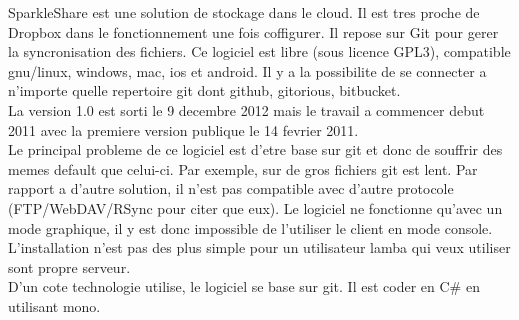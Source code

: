 SparkleShare est une solution de stockage dans le cloud. Il est tres proche de Dropbox dans le fonctionnement une fois coffigurer. Il repose sur Git pour gerer la syncronisation des fichiers. Ce logiciel est libre (sous licence GPL3), compatible gnu/linux, windows, mac, ios et android. Il y a la possibilite de se connecter a n'importe quelle repertoire git dont github, gitorious, bitbucket.\\

La version 1.0 est sorti le 9 decembre 2012 mais le travail a commencer debut 2011 avec la premiere version publique le 14 fevrier 2011.\\

Le principal probleme de ce logiciel est d'etre base sur git et donc de souffrir des memes default que celui-ci. Par exemple, sur de gros fichiers git est lent. Par rapport a d'autre solution, il n'est pas compatible avec d'autre protocole (FTP/WebDAV/RSync pour citer que eux). Le logiciel ne fonctionne qu'avec un mode graphique, il y est donc impossible de l'utiliser le client en mode console. L'installation n'est pas des plus simple pour un utilisateur lamba qui veux utiliser sont propre serveur.\\

D'un cote technologie utilise, le logiciel se base sur git. Il est coder en C\# en utilisant mono.\\
